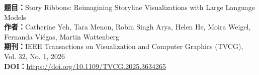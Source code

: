\documentclass[a4paper,12pt,UTF8]{article}
\begin{document}
\begin{center}
\begin{tcolorbox}[width=0.9\textwidth,colback=blue!3!white,colframe=blue!45!black,title=论文信息]
\centering
\textbf{题目：}Story Ribbons: Reimagining Storyline Visualizations with Large Language Models\\[0.5em]
\textbf{作者：}Catherine Yeh, Tara Menon, Robin Singh Arya, Helen He, Moira Weigel, Fernanda Vi\'egas, Martin Wattenberg\\[0.5em]
\textbf{期刊：}IEEE Transactions on Visualization and Computer Graphics (TVCG), Vol. 32, No. 1, 2026\\[0.5em]
\textbf{DOI：}\url{https://doi.org/10.1109/TVCG.2025.3634265}
\end{tcolorbox}
\end{center}





\clearpage


\tableofcontents
\thispagestyle{empty}
\clearpage


\pagestyle{fancy}
\setcounter{page}{1}
\end{document}
